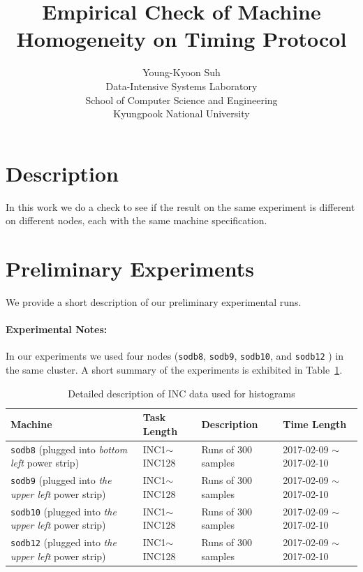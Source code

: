\documentclass[10pt]{article}
\begin{document}
\title{Empirical Check of Machine Homogeneity on Timing Protocol}

\author{
Young-Kyoon Suh\\
Data-Intensive Systems Laboratory\\
School of Computer Science and Engineering\\
Kyungpook National University\\
}
\maketitle

\section{Description}
In this work we do a check to see if the result on the same experiment is different 
on different nodes, each with the same machine specification.

\section{Preliminary Experiments}

We provide a short description of our preliminary experimental runs. 

\paragraph{Experimental Notes:} In our experiments 
we used four nodes ({\tt sodb8}, {\tt sodb9}, {\tt sodb10}, and {\tt sodb12} ) in the same cluster. 
A short summary of the experiments is exhibited in Table~\ref{tab:exp_notes}.

\begin{table}[h]
\begin{center}
\begin{tabular}{|p{4cm}|p{3cm}|p{4cm}|p{4cm}|} \hline
Machine & Task Length & Description & Time Length\\ \hline
{\tt sodb8} (plugged into {\em bottom left} power strip) & INC1$\sim$INC128 & Runs of 300 samples & 2017-02-09 $\sim$ 2017-02-10\\ \hline
{\tt sodb9}  (plugged into {\em the upper left} power strip)  &  INC1$\sim$INC128 & Runs of 300 samples & 2017-02-09 $\sim$ 2017-02-10\\ \hline
{\tt sodb10}  (plugged into {\em the upper left} power strip)  & INC1$\sim$INC128 & Runs of 300 samples & 2017-02-09 $\sim$ 2017-02-10\\ \hline
{\tt sodb12}  (plugged into {\em the upper left} power strip)  & INC1$\sim$INC128 & Runs of 300 samples & 2017-02-09 $\sim$ 2017-02-10\\ \hline
\end{tabular}
\end{center}
\vspace{-.2in}
\caption{Detailed description of INC data used for histograms\label{tab:exp_notes}}
\end{table}
\end{document}
